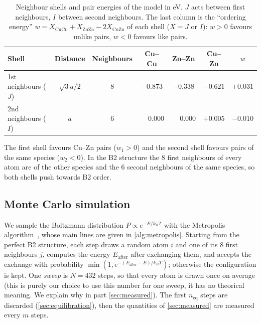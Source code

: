 \documentclass[11pt,a4paper]{article}
\newcommand{\Cu}{\mathrm{Cu}}
\newcommand{\Zn}{\mathrm{Zn}}
\begin{document}
\begin{table}[ht]
  \centering
  \caption{Neighbour shells and pair energies of the model in eV. $J$ acts between first neighbours, $I$ between second neighbours. The last column is the \enquote{ordering energy} $w = X_{\Cu\Cu}+X_{\Zn\Zn}-2X_{\Cu\Zn}$ of each shell ($X=J$ or $I$): $w>0$ favours unlike pairs, $w<0$ favours like pairs.}
  \label{tab:parameters}
  \begin{tabular}{lcccccc}
    \toprule
    Shell & Distance & Neighbours & Cu--Cu & Zn--Zn & Cu--Zn & $w$ \\
    \midrule
    1st neighbours ($J$) & $\sqrt{3}a/2$ & 8 & $-0.873$ & $-0.338$ & $-0.621$ & $+0.031$ \\
    2nd neighbours ($I$) & $a$ & 6 & $\phantom{-}0.000$ & $\phantom{-}0.000$ & $+0.005$ & $-0.010$ \\
    \bottomrule
  \end{tabular}
\end{table}

The first shell favours Cu--Zn pairs ($w_1>0$) and the second shell favours pairs of the same species ($w_2<0$).
In the B2 structure the 8 first neighbours of every atom are of the other species and the 6 second neighbours of the same species, so both shells push towards B2 order.

\subsection{Monte Carlo simulation}

We sample the Boltzmann distribution $P\propto e^{-E/k_BT}$ with the Metropolis algorithm~\cite{HayounDammak2026}, whose main lines are given in \cref{alg:metropolis}.
Starting from the perfect B2 structure, each step draws a random atom $i$ and one of its 8 first neighbours $j$, computes the energy $E_\mathrm{after}$ after exchanging them, and accepts the exchange with probability $\min\left(1,e^{-(E_\mathrm{after}-E)/k_BT}\right)$; otherwise the configuration is kept.
One \emph{sweep} is $N=432$ steps, so that every atom is drawn once on average (this is purely our choice to use this number for one sweep, it has no theorical meaning. We explain why in part \ref{sec:measured}).
The first $n_\mathrm{eq}$ steps are discarded (\cref{sec:equilibration}), then the quantities of \cref{sec:measured} are measured every $m$ steps.
\end{document}
